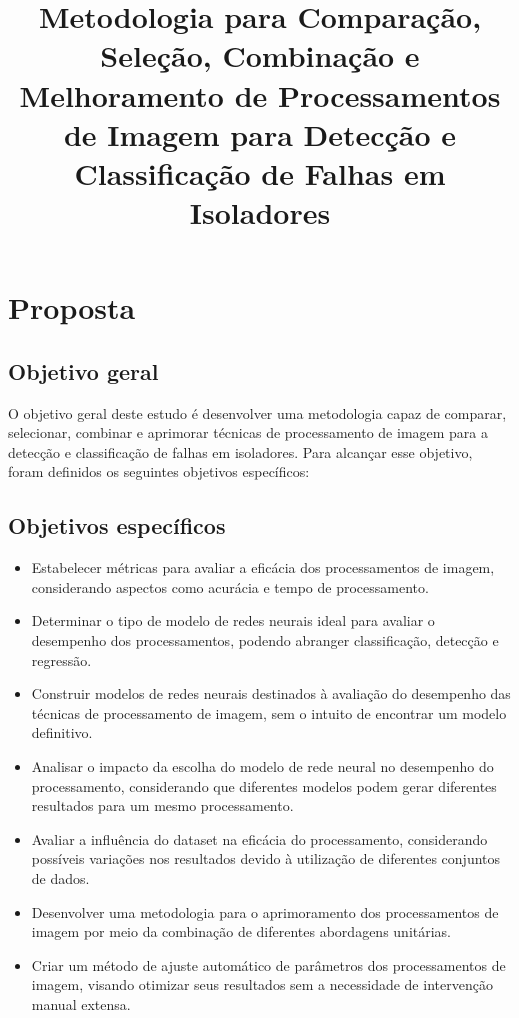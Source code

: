 \documentclass[12pt]{article}
\title{Metodologia para Comparação, Seleção, Combinação e Melhoramento de Processamentos de Imagem para Detecção e Classificação de Falhas em Isoladores}
\author{}
\date{}
\begin{document}
\maketitle

\section{Proposta}

\subsection{Objetivo geral}

O objetivo geral deste estudo é desenvolver uma metodologia capaz de comparar, selecionar, combinar e aprimorar técnicas de processamento de imagem para a detecção e classificação de falhas em isoladores. Para alcançar esse objetivo, foram definidos os seguintes objetivos específicos:

\subsection{Objetivos específicos}

\begin{itemize}
    \item Estabelecer métricas para avaliar a eficácia dos processamentos de imagem, considerando aspectos como acurácia e tempo de processamento.
    \item Determinar o tipo de modelo de redes neurais ideal para avaliar o desempenho dos processamentos, podendo abranger classificação, detecção e regressão.
    \item Construir modelos de redes neurais destinados à avaliação do desempenho das técnicas de processamento de imagem, sem o intuito de encontrar um modelo definitivo.
    \item Analisar o impacto da escolha do modelo de rede neural no desempenho do processamento, considerando que diferentes modelos podem gerar diferentes resultados para um mesmo processamento.
    \item Avaliar a influência do dataset na eficácia do processamento, considerando possíveis variações nos resultados devido à utilização de diferentes conjuntos de dados.
    \item Desenvolver uma metodologia para o aprimoramento dos processamentos de imagem por meio da combinação de diferentes abordagens unitárias.
    \item Criar um método de ajuste automático de parâmetros dos processamentos de imagem, visando otimizar seus resultados sem a necessidade de intervenção manual extensa.
\end{itemize}
\end{document}
